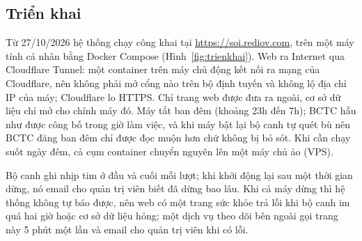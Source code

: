 \documentclass[12pt,a4paper]{report}
\begin{document}
\subsection{Triển khai}
Từ 27/10/2026 hệ thống chạy công khai tại \url{https://soi.rediov.com}, trên một máy tính cá nhân bằng Docker Compose
(Hình~\ref{fig:trienkhai}). Web ra Internet qua Cloudflare Tunnel: một container trên máy chủ động kết nối ra mạng của
Cloudflare, nên không phải mở cổng nào trên bộ định tuyến và không lộ địa chỉ IP của máy; Cloudflare lo HTTPS. Chỉ trang
web được đưa ra ngoài, cơ sở dữ liệu chỉ mở cho chính máy đó. Máy tắt ban đêm (khoảng 23h đến 7h); BCTC hầu như được công
bố trong giờ làm việc, và khi máy bật lại bộ canh tự quét bù nên BCTC đăng ban đêm chỉ được đọc muộn hơn chứ không bị bỏ
sót. Khi cần chạy suốt ngày đêm, cả cụm container chuyển nguyên lên một máy chủ ảo (VPS).

Bộ canh ghi nhịp tim ở đầu và cuối mỗi lượt; khi khởi động lại sau một thời gian dừng, nó email cho quản trị viên biết đã
dừng bao lâu. Khi cả máy dừng thì hệ thống không tự báo được, nên web có một trang sức khỏe trả lỗi khi bộ canh im quá hai
giờ hoặc cơ sở dữ liệu hỏng; một dịch vụ theo dõi bên ngoài gọi trang này 5 phút một lần và email cho quản trị viên khi
có lỗi.
\end{document}
